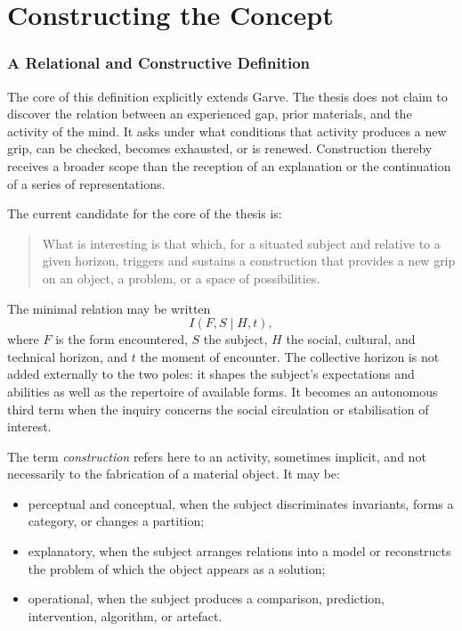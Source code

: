 \documentclass[11pt,a4paper]{article}
\begin{document}
\part{Constructing the Concept}

\section{A Relational and Constructive Definition}

The core of this definition explicitly extends Garve. The thesis does not claim
to discover the relation between an experienced gap, prior materials, and the
activity of the mind. It asks under what conditions that activity produces a
new grip, can be checked, becomes exhausted, or is renewed. Construction thereby
receives a broader scope than the reception of an explanation or the
continuation of a series of representations.

The current candidate for the core of the thesis is:

\begin{quote}
What is interesting is that which, for a situated subject and relative to a
given horizon, triggers and sustains a construction that provides a new grip on
an object, a problem, or a space of possibilities.
\end{quote}

The minimal relation may be written
\[
  I(F,S\mid H,t),
\]
where \(F\) is the form encountered, \(S\) the subject, \(H\) the social,
cultural, and technical horizon, and \(t\) the moment of encounter. The
collective horizon is not added externally to the two poles: it shapes the
subject's expectations and abilities as well as the repertoire of available
forms. It becomes an autonomous third term when the inquiry concerns the social
circulation or stabilisation of interest.

The term \emph{construction} refers here to an activity, sometimes implicit, and
not necessarily to the fabrication of a material object. It may be:

\begin{itemize}
  \item perceptual and conceptual, when the subject discriminates invariants,
        forms a category, or changes a partition;
  \item explanatory, when the subject arranges relations into a model or
        reconstructs the problem of which the object appears as a solution;
  \item operational, when the subject produces a comparison, prediction,
        intervention, algorithm, or artefact.
\end{itemize}
\end{document}
